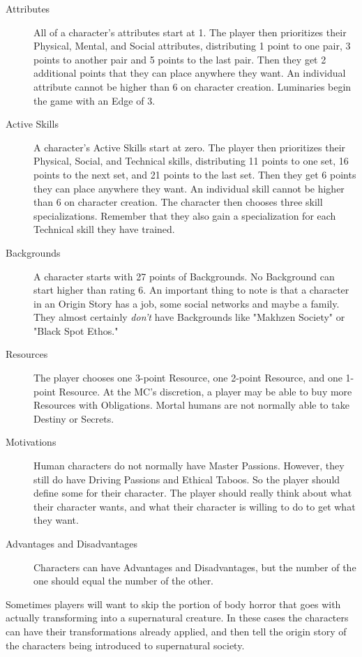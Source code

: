 \begin{description}
\item[Attributes]
All of a character's attributes start at 1. The player then prioritizes their Physical, Mental, and Social attributes, distributing 1 point to one pair, 3 points to another pair and 5 points to the last pair. Then they get 2 additional points that they can place anywhere they want. An individual attribute cannot be higher than 6 on character creation.
Luminaries begin the game with an Edge of 3.

\item[Active Skills]
A character's Active Skills start at zero. The player then prioritizes their Physical, Social, and Technical skills, distributing 11 points to one set, 16 points to the next set, and 21 points to the last set. Then they get 6 points they can place anywhere they want. An individual skill cannot be higher than 6 on character creation. The character then chooses three skill specializations. Remember that they also gain a specialization for each Technical skill they have trained.

\item[Backgrounds]
A character starts with 27 points of Backgrounds. No Background can start higher than rating 6. An important thing to note is that a character in an Origin Story has a job, some social networks and maybe a family. They almost certainly \textit{don't} have Backgrounds like "Makhzen Society" or "Black Spot Ethos." 

\item[Resources]
The player chooses one 3-point Resource, one 2-point Resource, and one 1-point Resource. At the MC's discretion, a player may be able to buy more Resources with Obligations. Mortal humans are not normally able to take Destiny or Secrets.

\item[Motivations]
Human characters do not normally have Master Passions. However, they still do have Driving Passions and Ethical Taboos. So the player should define some for their character. The player should really think about what their character wants, and what their character is willing to do to get what they want.

\item[Advantages and Disadvantages]
Characters can have Advantages and Disadvantages, but the number of the one should equal the number of the other.
\end{description}

Sometimes players will want to skip the portion of body horror that goes with actually transforming into a supernatural creature. In these cases the characters can have their transformations already applied, and then tell the origin story of the characters being introduced to supernatural society.

